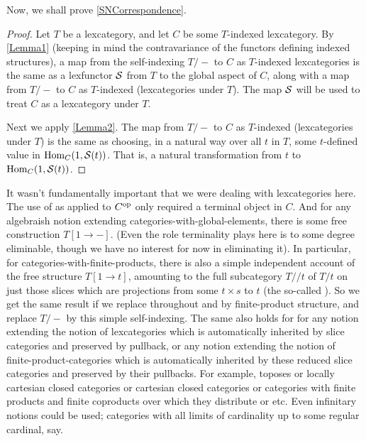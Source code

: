 \documentclass[./main.tex]{subfiles}
\begin{document}
Now, we shall prove \cref{SNCorrespondence}.

\begin{proof}
Let $T$ be a lexcategory, and let $C$ be some $T$-indexed lexcategory. By \cref{Lemma1} (keeping in mind the contravariance of the functors defining indexed structures), a map from the self-indexing $T/-$ to $C$ as $T$-indexed lexcategories is the same as a lexfunctor $\mathcal{S}$ from $T$ to the global aspect of $C$, along with a map from $T/-$ to $C$ as $T$-indexed (lexcategories under $T$). The map $\mathcal{S}$ will be used to treat $C$ as a lexcategory under $T$.

Next we apply \cref{Lemma2}. The map from $T/-$ to $C$ as $T$-indexed (lexcategories under $T$) is the same as choosing, in a natural way over all $t$ in $T$, some $t$-defined value in $\operatorname{Hom}_C(1, \mathcal{S}(t))$. That is, a natural transformation from $t$ to $\operatorname{Hom}_C(1, \mathcal{S}(t))$.
\end{proof}

\begin{remark}\label{IntrospGeneralDoctrine}
It wasn't fundamentally important that we were dealing with lexcategories here. The use of  as applied to $C^{\mathrm{op}}$ only required a terminal object in $C$. And for any algebraish notion extending categories-with-global-elements, there is some free construction $T[1 \to -]$. (Even the role terminality plays here is to some degree eliminable, though we have no interest for now in eliminating it). In particular, for categories-with-finite-products, there is also a simple independent account of the free structure $T[1 \to t]$, amounting to the full subcategory $T//t$ of $T/t$ on just those slices which are projections from some $t \times s$ to $t$ (the so-called ). So we get the same result if we replace throughout  and  by finite-product structure, and replace $T/-$ by this simple self-indexing. The same also holds for for any notion extending the notion of lexcategories which is automatically inherited by slice categories and preserved by pullback, or any notion extending the notion of finite-product-categories which is automatically inherited by these reduced slice categories and preserved by their pullbacks. For example, toposes or locally cartesian closed categories or cartesian closed categories or categories with finite products and finite coproducts over which they distribute or etc. Even infinitary notions could be used; categories with all limits of cardinality up to some regular cardinal, say.
\end{remark}
\end{document}
